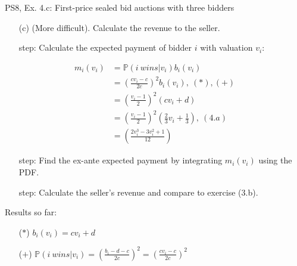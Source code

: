 \begin{frame}{PS8, Ex. 4.c: First-price sealed bid auctions with three bidders}
    \begin{itemize}
      \item[(c)] (More difficult). Calculate the revenue to the seller.
    \end{itemize}
    \vspace{-8pt}
    \begin{multicols}{2}
      \begin{itemize}
        \item[\nth{1} step:] Calculate the expected payment of bidder $i$ with valuation $v_i$:
      \end{itemize}
      \vspace{-14pt}
      \begin{align*}
        m_i(v_i)&=\mathbb{P}(i\ wins|v_i)b_i(v_i)\\
                &=\left(\frac{cv_i-c}{2c}\right)^2b_i(v_i),\ (*),(+)\\
                &=\left(\frac{v_i-1}{2}\right)^2(cv_i+d)\\
                &=\left(\frac{v_i-1}{2}\right)^2\left(\frac{2}{3}v_i+\frac{1}{3}\right),\ (4.a)\\
                &=\left(\frac{2v_i^3-3v_i^2+1}{12}\right)
      \end{align*}
      \vspace{-14pt}
      \begin{itemize}
        \item[\nth{2} step:] Find the ex-ante expected payment by integrating $m_i(v_i)$ using the PDF.
      \end{itemize}
      \vspace{-4pt}
      \vspace{-4pt}
      \begin{itemize}
        \item[\nth{3} step:] Calculate the seller's revenue and compare to exercise (3.b).
      \end{itemize}
      \vfill\null\columnbreak
      Results so far:
      \vspace{-6pt}
      \begin{itemize}
        \item[($*$)] $b_i(v_i) = cv_i+d$
        \item[($+$)] $\mathbb{P}(i\ wins|v_i)=\left(\frac{b_i-d-c}{2c}\right)^2=\left(\frac{cv_i-c}{2c}\right)^2$

\end{itemize}
\end{multicols}
\end{frame}
